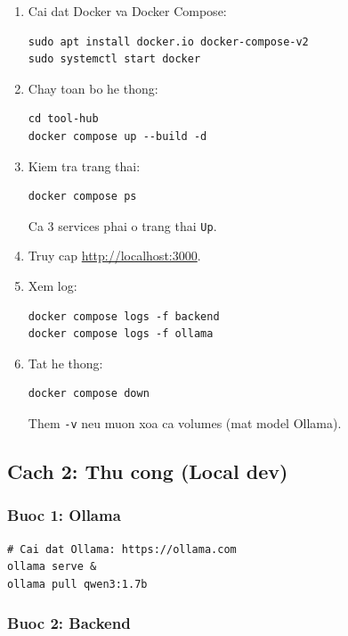 \documentclass[12pt,a4paper]{article}
\begin{document}
\begin{enumerate}
  \item Cai dat Docker va Docker Compose:
\begin{lstlisting}[style=bash, language={}]
sudo apt install docker.io docker-compose-v2
sudo systemctl start docker
\end{lstlisting}

  \item Chay toan bo he thong:
\begin{lstlisting}[style=bash, language={}]
cd tool-hub
docker compose up --build -d
\end{lstlisting}

  \item Kiem tra trang thai:
\begin{lstlisting}[style=bash, language={}]
docker compose ps
\end{lstlisting}
        Ca 3 services phai o trang thai \texttt{Up}.

  \item Truy cap \url{http://localhost:3000}.

  \item Xem log:
\begin{lstlisting}[style=bash, language={}]
docker compose logs -f backend
docker compose logs -f ollama
\end{lstlisting}

  \item Tat he thong:
\begin{lstlisting}[style=bash, language={}]
docker compose down
\end{lstlisting}
        Them \texttt{-v} neu muon xoa ca volumes (mat model Ollama).
\end{enumerate}

\subsection{Cach 2: Thu cong (Local dev)}

\subsubsection{Buoc 1: Ollama}

\begin{lstlisting}[style=bash, language={}]
# Cai dat Ollama: https://ollama.com
ollama serve &
ollama pull qwen3:1.7b
\end{lstlisting}

\subsubsection{Buoc 2: Backend}
\end{document}
